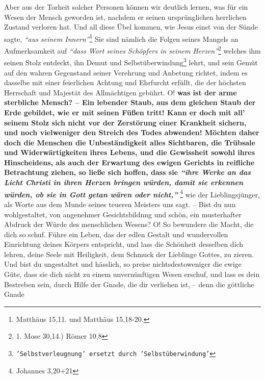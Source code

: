 Aber aus der Torheit solcher Personen können wir deutlich lernen, was für ein
Wesen der Mensch geworden ist, nachdem er seinen ursprünglichen herrlichen
Zustand verloren hat. Und all diese Übel kommen, wie Jesus einst von der
Sünde
sagte,
\textit{"`aus seinem Innern"'}\footnote{Matthäus 15,11. und Matthäus 15,18-20.}
Sie sind nämlich
die Folgen seines Mangels an Aufmerksamkeit auf
\textit{"`dass Wort seines Schöpfers in
seinem Herzen"'}\footnote{1. Mose 30,14.) Römer 10,8}
welches ihm seinen Stolz
entdeckt, ihn Demut und
Selbstüberwindung\footnote{\texttt{'Selbstverleugnung' ersetzt durch
'Selbstüberwindung'}}
lehrt, und sein Gemüt auf den
wahren Gegenstand seiner Verehrung und Anbetung richtet, indem es dasselbe mit
einer feierlichen Achtung und Ehrfurcht erfüllt, die der höchsten Herrschaft und
Majestät des Allmächtigen gebührt. O!  
 \label{ref:11_10_juengstes_gericht}
\textbf{was ist der arme sterbliche Mensch? --
Ein lebender Staub, aus dem gleichen Staub der Erde gebildet, wie er mit seinen
Füßen tritt! Kann er doch mit all' seinem Stolz sich nicht vor der Zerstörung
einer Krankheit sichern, und noch vielweniger den Streich des Todes abwenden!
Möchten daher doch die Menschen die Unbeständigkeit alles Sichtbaren, die
Trübsale und Widerwärtigkeiten ihres Lebens, und die Gewissheit sowohl ihres
Hinscheidens, als auch der Erwartung des ewigen Gerichts in reifliche
Betrachtung ziehen, so ließe sich hoffen, dass sie
\textit{"`ihre Werke an das Licht
Christi in ihren Herzen bringen würden, damit sie erkennen würden, ob sie in
Gott
getan wären oder nicht,"'} }\footnote{Johannes 3,20+21}
wie der Lieblingsjünger, als
Worte aus dem Munde seines teueren Meisters uns sagt. -- Bist du nun
wohlgestaltet, von angenehmer Gesichtsbildnng und schön, ein musterhafter
Abdruck der Würde des menschlichen Wesens? O! So bewundere die Macht, die dich
so schuf. Führe ein Leben, das der edlen Gestalt und wundervollen Einrichtung
deines Körpers entspricht, und lass die Schönheit desselben dich lehren, deine
Seele mit Heiligkeit, dem Schmuck der
Lieblinge Gottes, zu zieren. Und bist du
ungestaltet und hässlich, so preise nichtsdestoweniger die ewige Güte, dass sie
dich nicht zu einem unvernünftigen Wesen erschuf, und lass es dein Bestreben
sein, durch Hilfe der Gnade, die dir verliehen ist, --  denn die
göttliche Gnade
